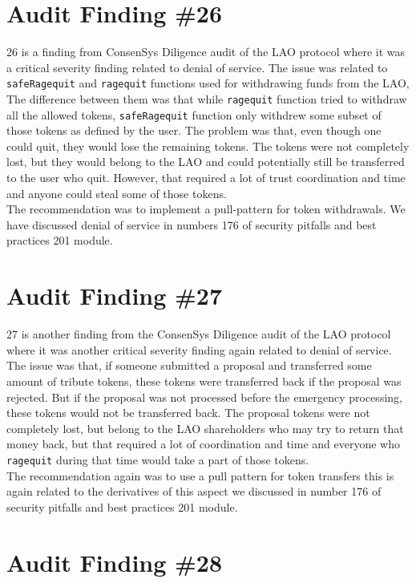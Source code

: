 \section{Audit Finding \#26}

26 is a finding from ConsenSys Diligence audit of the LAO protocol where it was a critical severity finding related to denial of service. The issue was related to \verb|safeRagequit| and \verb|ragequit| functions used for withdrawing funds from the LAO, The difference between them was that while \verb|ragequit| function tried to withdraw all the allowed tokens, \verb|safeRagequit| function only withdrew some subset of those tokens as defined by the user. The problem was that, even though one could quit, they would lose the remaining tokens. The tokens were not completely lost, but they would belong to the LAO and could potentially still be transferred to the user who quit. However, that required a lot of trust coordination and time and anyone could steal some of those tokens.\\

The recommendation was to implement a pull-pattern for token withdrawals. We have discussed denial of service in numbers 176 of security pitfalls and best practices 201 module.

\section{Audit Finding \#27}

27 is another finding from the ConsenSys Diligence audit of the LAO protocol where it was another critical severity finding again related to denial of service. The issue was that, if someone submitted a proposal and transferred some amount of tribute tokens, these tokens were transferred back if the proposal was rejected. But if the proposal was not processed before the emergency processing, these tokens would not be transferred back. The proposal tokens were not completely lost, but belong to the LAO shareholders who may try to return that money back, but that required a lot of coordination and time and everyone who \verb|ragequit| during that time would take a part of those tokens.\\

The recommendation again was to use a pull pattern for token transfers this is again related to the derivatives of this aspect we discussed in number 176 of security pitfalls and best practices 201 module.

\section{Audit Finding \#28}


